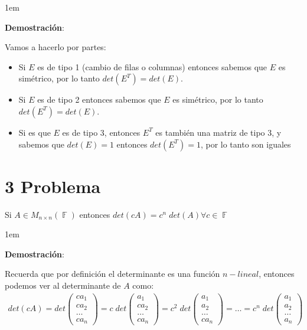 \documentclass[12pt, fleqn]{article}                             %
\newenvironment{SmallIndentation}[1][0.75em]                    %
        {\begin{adjustwidth}{#1}{}\begin{footnotesize}}             %
        {\end{footnotesize}\end{adjustwidth}}                       %
\theoremstyle{break}                                            %
\DeclareMathOperator \GenericField {\mathbb{F}}                 %
\newcommand{\Wrap}[1]    {\left( #1 \right)}                    %
\newcommand{\pVector}[1]                                        %
        { \ensuremath{\begin{pmatrix}#1\end{pmatrix}} }             %
\begin{document}
    \begin{SmallIndentation}[1em]
        \textbf{Demostración}:
        
        Vamos a hacerlo por partes:
        \begin{itemize}
            
            \item 
                Si $E$ es de tipo 1 (cambio de filas o columnas) entonces
                sabemos que $E$ es simétrico, por lo tanto $det(E^T) = det(E)$.

            \item 
                Si $E$ es de tipo 2 entonces sabemos que $E$ es simétrico,
                por lo tanto $det(E^T) = det(E)$.

            \item
                Si es que $E$ es de tipo 3, entonces $E^T$ es también una matriz 
                de tipo 3, y sabemos que $det(E) = 1$ entonces $det(E^T) = 1$, por lo
                tanto son iguales 
        \end{itemize}
    
    \end{SmallIndentation}


\vspace{1em}
\section{3 Problema}


    Si $A \in M_{n \times n}(\GenericField)$ entonces $det(cA) = c^n \; det(A) \forall c \in \GenericField$
    \begin{SmallIndentation}[1em]
        \textbf{Demostración}:
        
        Recuerda que por definición el determinante es una función $n-lineal$, entonces
        podemos ver al determinante de $A$ como:
        \begin{align*}
            det\Wrap{cA}
                = det\pVector{ca_1 \\ ca_2 \\ \ldots  \\ca_n }              
                = c \; det\pVector{a_1 \\ ca_2 \\ \ldots  \\ca_n }          
                = c^2 \; det\pVector{a_1 \\ a_2 \\ \ldots  \\ca_n } 
                = \dots        
                = c^n \; det\pVector{a_1 \\ a_2 \\ \ldots  \\ a_n }
        \end{align*}
    
    \end{SmallIndentation}
\end{document}
